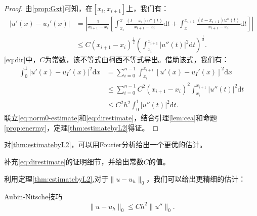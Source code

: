 \documentclass[lang=cn,10pt,newtx]{elegantbook}
\newcommand{\dif}{\mathrm{d}}
\newcommand{\norm}[1]{\|#1\|}
\begin{document}
\begin{proof}
  由\ref{prop:Gxt}可知，在$[x_{i},x_{i+1}]$上，我们有：
  \begin{equation}
    \label{eq:dir}
    \begin{aligned}
    |u'(x)-u_{I}'(x)|&=\left|\frac{1}{x_{i+1}-x_{i}}\left[\int_{x_{i}}^{x}\frac{(t-x_{i})u''(t)}{x_{i+1}-x_{i}}\dif t+\int_{x}^{x_{i+1}}\frac{(t-x_{i+1})u''(t)}{x_{i+1}-x_{i}}\dif t\right]\right|\\
    &\le C(x_{i+1}-x_{i})^{\frac{1}{2}}\left(\int_{x_{i}}^{x_{i+1}}|u''(t)|^{2}\dif t\right)^{\frac{1}{2}}.
    \end{aligned}
  \end{equation}
  \eqref{eq:dir}中，$C$为常数，该不等式由柯西不等式导出。借助该式，我们有：
  \begin{equation}
    \label{eq:direstimate}
    \begin{aligned}
      \int_{0}^{1}|u'(x)-u_{I}'(x)|^{2}\dif x&=\sum_{i=0}^{n-1}\int_{x_{i}}^{x_{i+1}}[u'(x)-u_{I}'(x)]^{2}\dif x\\
      &\le\sum_{i=0}^{n-1}C^{2}(x_{i+1}-x_{i})^{2}\int_{x_{i}}^{x_{i+1}}|u''(t)|^{2}\dif t\\
      &\le C^{2}h^{2}\int_{0}^{1}|u''(t)|^{2}\dif t.
    \end{aligned}
  \end{equation}
  联立\eqref{eq:norm0-estimate}和\eqref{eq:direstimate}，结合引理\ref{lem:cea}和命题\ref{prop:enermy}，定理\ref{thm:estimatebyL2}得证。
\end{proof}
\begin{remark}
  对\ref{thm:estimatebyL2}，可以用Fourier分析给出一个更优的估计。
\end{remark}
\begin{exercise}
  补充\eqref{eq:direstimate}的证明细节，并给出常数$C$的值。
\end{exercise}
利用定理\ref{thm:estimatebyL2},对于$\norm{u-u_{h}}_{0}$，我们可以给出更精细的估计：
\begin{theorem}{Aubin-Nitsche技巧}
  \begin{equation}
    \label{eq:AubinNitsche}
    \norm{u-u_{h}}_{0}\le Ch^{2}\norm{u''}_{0}.
  \end{equation}
\end{theorem}
\end{document}
